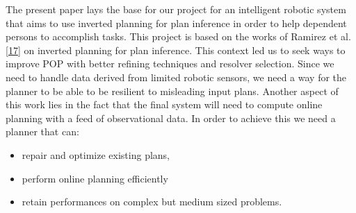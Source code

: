 The present paper lays the base for our project for an intelligent
robotic system that aims to use inverted planning for plan inference in
order to help dependent persons to accomplish tasks. This project is
based on the works of Ramirez et al.
{[}\protect\hyperlink{ref-ramirezux5fplanux5f2009}{17}{]} on inverted
planning for plan inference. This context led us to seek ways to improve
POP with better refining techniques and resolver selection. Since we
need to handle data derived from limited robotic sensors, we need a way
for the planner to be able to be resilient to misleading input plans.
Another aspect of this work lies in the fact that the final system will
need to compute online planning with a feed of observational data. In
order to achieve this we need a planner that can:

\begin{itemize}
\tightlist
\item
  repair and optimize existing plans,
\item
  perform online planning efficiently
\item
  retain performances on complex but medium sized problems.
\end{itemize}


